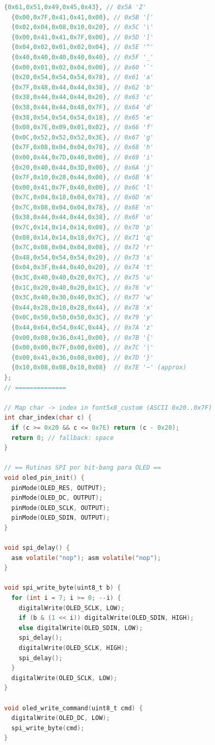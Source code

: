 \documentclass[a4paper,12pt]{article}
\begin{document}
\begin{lstlisting}[language=C]
  {0x61,0x51,0x49,0x45,0x43}, // 0x5A 'Z'
  {0x00,0x7F,0x41,0x41,0x00}, // 0x5B '['
  {0x02,0x04,0x08,0x10,0x20}, // 0x5C '\'
  {0x00,0x41,0x41,0x7F,0x00}, // 0x5D ']'
  {0x04,0x02,0x01,0x02,0x04}, // 0x5E '^'
  {0x40,0x40,0x40,0x40,0x40}, // 0x5F '_'
  {0x00,0x01,0x02,0x04,0x00}, // 0x60 '`'
  {0x20,0x54,0x54,0x54,0x78}, // 0x61 'a'
  {0x7F,0x48,0x44,0x44,0x38}, // 0x62 'b'
  {0x38,0x44,0x44,0x44,0x20}, // 0x63 'c'
  {0x38,0x44,0x44,0x48,0x7F}, // 0x64 'd'
  {0x38,0x54,0x54,0x54,0x18}, // 0x65 'e'
  {0x08,0x7E,0x09,0x01,0x02}, // 0x66 'f'
  {0x0C,0x52,0x52,0x52,0x3E}, // 0x67 'g'
  {0x7F,0x08,0x04,0x04,0x78}, // 0x68 'h'
  {0x00,0x44,0x7D,0x40,0x00}, // 0x69 'i'
  {0x20,0x40,0x44,0x3D,0x00}, // 0x6A 'j'
  {0x7F,0x10,0x28,0x44,0x00}, // 0x6B 'k'
  {0x00,0x41,0x7F,0x40,0x00}, // 0x6C 'l'
  {0x7C,0x04,0x18,0x04,0x78}, // 0x6D 'm'
  {0x7C,0x08,0x04,0x04,0x78}, // 0x6E 'n'
  {0x38,0x44,0x44,0x44,0x38}, // 0x6F 'o'
  {0x7C,0x14,0x14,0x14,0x08}, // 0x70 'p'
  {0x08,0x14,0x14,0x18,0x7C}, // 0x71 'q'
  {0x7C,0x08,0x04,0x04,0x08}, // 0x72 'r'
  {0x48,0x54,0x54,0x54,0x20}, // 0x73 's'
  {0x04,0x3F,0x44,0x40,0x20}, // 0x74 't'
  {0x3C,0x40,0x40,0x20,0x7C}, // 0x75 'u'
  {0x1C,0x20,0x40,0x20,0x1C}, // 0x76 'v'
  {0x3C,0x40,0x30,0x40,0x3C}, // 0x77 'w'
  {0x44,0x28,0x10,0x28,0x44}, // 0x78 'x'
  {0x0C,0x50,0x50,0x50,0x3C}, // 0x79 'y'
  {0x44,0x64,0x54,0x4C,0x44}, // 0x7A 'z'
  {0x00,0x08,0x36,0x41,0x00}, // 0x7B '{'
  {0x00,0x00,0x7F,0x00,0x00}, // 0x7C '|'
  {0x00,0x41,0x36,0x08,0x00}, // 0x7D '}'
  {0x10,0x08,0x08,0x10,0x08}  // 0x7E '~' (approx)
};
// ==============

// Map char -> index in font5x8_custom (ASCII 0x20..0x7F)
int char_index(char c) {
  if (c >= 0x20 && c <= 0x7E) return (c - 0x20);
  return 0; // fallback: space
}

// == Rutinas SPI por bit-bang para OLED ==
void oled_pin_init() {
  pinMode(OLED_RES, OUTPUT);
  pinMode(OLED_DC, OUTPUT);
  pinMode(OLED_SCLK, OUTPUT);
  pinMode(OLED_SDIN, OUTPUT);
}

void spi_delay() {
  asm volatile("nop"); asm volatile("nop");
}

void spi_write_byte(uint8_t b) {
  for (int i = 7; i >= 0; --i) {
    digitalWrite(OLED_SCLK, LOW);
    if (b & (1 << i)) digitalWrite(OLED_SDIN, HIGH);
    else digitalWrite(OLED_SDIN, LOW);
    spi_delay();
    digitalWrite(OLED_SCLK, HIGH);
    spi_delay();
  }
  digitalWrite(OLED_SCLK, LOW);
}

void oled_write_command(uint8_t cmd) {
  digitalWrite(OLED_DC, LOW);
  spi_write_byte(cmd);
}


\end{lstlisting}
\end{document}
